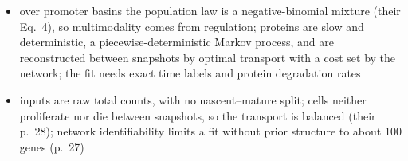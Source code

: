 \begin{itemize}
\begin{itemize}
          \(1+k^{\mathrm{syn}}_{g}/k^{\mathrm{off}}_{g}\), and \(\psi_{g}=k^{\mathrm{on}}_{g}/k^{\mathrm{deg}}_{g}\), the burst frequency in units of mRNA
          lifetime (their Eq.~3)
    \item over promoter basins the population law is a negative-binomial mixture (their Eq.~4), so multimodality comes
          from regulation; proteins are slow and deterministic, a piecewise-deterministic Markov process, and are
          reconstructed between snapshots by optimal transport with a cost set by the network; the fit needs exact
          time labels and protein degradation rates
    \item inputs are raw total counts, with no nascent--mature split; cells neither proliferate nor die between
          snapshots, so the transport is balanced (their p.~28); network identifiability limits a fit without prior
          structure to about 100 genes (p.~27)
  \end{itemize}
\end{itemize}

